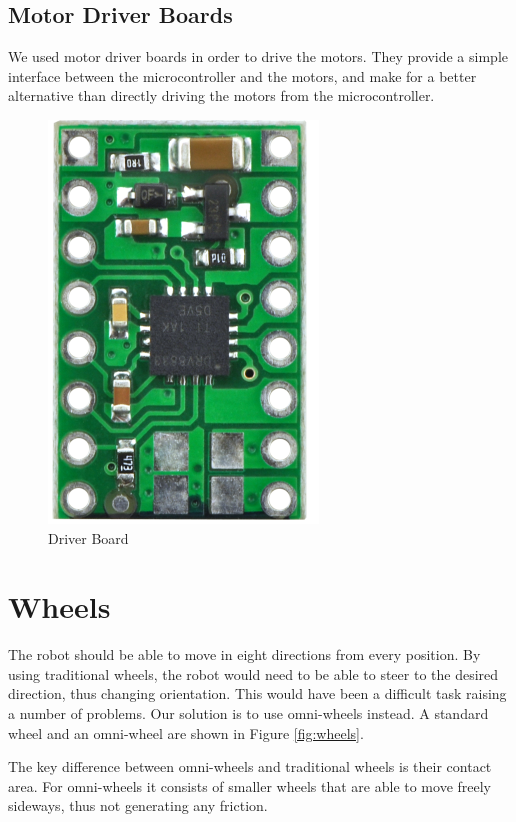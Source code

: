 \subsection{Motor Driver Boards}\label{sec:driver_boards}
We used motor driver boards in order to drive the motors. They provide a simple interface between 
the microcontroller and the motors, and make for a better alternative than directly driving the 
motors from the microcontroller.
\begin{figure}[htp]
	\centering
	\includegraphics[scale=0.6]{figures/move/driver_board}
	\caption{Driver Board}
\end{figure}
\section{Wheels}\label{sec:wheels}
The robot should be able to move in eight directions from every position.
By using traditional wheels, the robot would need to be able to steer to the desired direction, 
thus changing orientation.
This would have been a difficult task raising a number of problems.
Our solution is to use omni-wheels instead.
A standard wheel and an omni-wheel are shown in Figure \ref{fig:wheels}.

The key difference between omni-wheels and traditional wheels is their contact area.
For omni-wheels it consists of smaller wheels that are able to move freely sideways,
thus not generating any friction.

